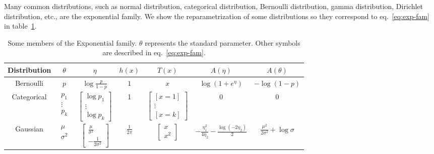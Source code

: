 Many common distributions, such as normal distribution, categorical distribution, Bernoulli distribution, gamma distribution, 
Dirichlet distribution, etc., are the exponential family. We show the reparametrization of some 
distributions so they correspond to eq.~\ref{eq:exp-fam} in table~\ref{tab:exp-fam-reparametrization}.
\begin{table}[ht]
    \centering
    \begin{tabular}{|c|c|c|c|c|c|c|}
      \hline
      Distribution & $\theta$ & $\eta$ & $h(x)$ & $T(x)$ & $A(\eta)$ & $A(\theta)$ \\
      \hline
      Bernoulli & $p$ & $\log \frac{p}{1-p}$ & $1$ & $x$ & $\log(1+e^{\eta})$ & $-\log(1-p)$\\
      \hline
      Categorical & $\begin{array}{c} p_1 \\ \vdots \\ p_k\end{array}$ & $\begin{bmatrix}\log p_1 \\ \vdots \\ \log p_k\end{bmatrix}$ & 1&  $\begin{bmatrix} [x=1] \\ \vdots \\ [x=k] \end{bmatrix}$ & 0& 0\\
      \hline
      Gaussian & $\begin{array}{c} \mu \\ \sigma^2 \end{array}$ & $\begin{bmatrix} \frac{\mu}{\sigma^2}\\ -\frac{1}{2\sigma^2} \end{bmatrix}$  & $\frac{1}{2\pi}$ & $\begin{bmatrix} x \\ x^2 \end{bmatrix} $  & $-\frac{\eta_1^2}{4\eta_2} - \frac{\log(-2\eta_2)}{2}$& $\frac{\mu^2}{2\sigma^2} + \log \sigma$\\
      \hline
    \end{tabular}
  \caption[Representatives of Exponential Family]{Some members of the Exponential family. $\theta$ represents the standard parameter. Other symbols are described in eq.~\ref{eq:exp-fam}.}
  \label{tab:exp-fam-reparametrization}
  \end{table}
  
